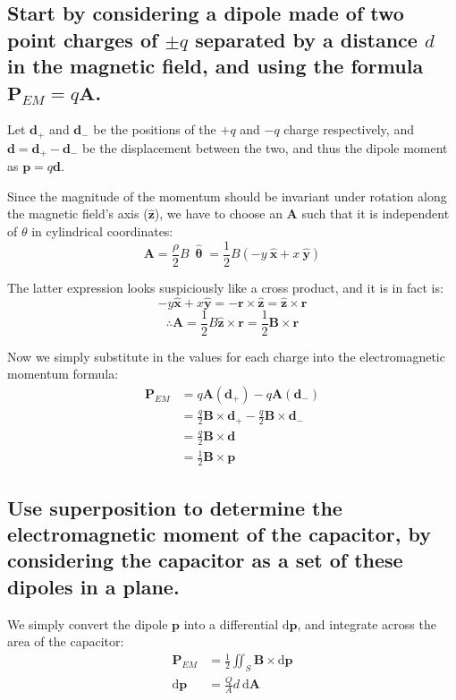\documentclass[a4paper]{scrartcl}
\begin{document}
\subsection{Start by considering a dipole made of two point charges of \(\pm q\) separated by a distance \(d\) in the magnetic field, and using the formula \(\mathbf{P}_{EM} = q \mathbf{A}\).}
Let \(\mathbf{d}_+\) and \(\mathbf{d}_-\) be the positions of the \(+q\) and \(-q\) charge respectively, and \(\mathbf{d} = \mathbf{d}_+ - \mathbf{d}_-\) be the displacement between the two, and thus the dipole moment as \(\mathbf{p} = q \mathbf{d}\).

Since the magnitude of the momentum should be invariant under rotation along the magnetic field's axis (\(\hat{\mathbf{z}}\)), we have to choose an \(\mathbf{A}\) such that it is independent of \(\theta\) in cylindrical coordinates:
\[\mathbf{A} = \frac{\rho}{2} B \:\hat{\boldsymbol{\uptheta}} = \frac{1}{2} B (-y \:\hat{\mathbf{x}} + x \:\hat{\mathbf{y}})\]

The latter expression looks suspiciously like a cross product, and it is in fact is:
\[-y \hat{\mathbf{x}} + x \hat{\mathbf{y}} = -\mathbf{r} \times \hat{\mathbf{z}} = \hat{\mathbf{z}} \times \mathbf{r}\]
\[\therefore \mathbf{A} = \frac{1}{2} B \hat{\mathbf{z}} \times \mathbf{r} = \frac{1}{2} \mathbf{B} \times \mathbf{r}\]

Now we simply substitute in the values for each charge into the electromagnetic momentum formula:
\begin{align*}
    \mathbf{P}_{EM} &= q \mathbf{A}(\mathbf{d}_+) - q \mathbf{A}(\mathbf{d}_-) \\
    &= \frac{q}{2} \mathbf{B} \times \mathbf{d}_+ - \frac{q}{2} \mathbf{B} \times \mathbf{d}_- \\
    &= \frac{q}{2} \mathbf{B} \times \mathbf{d} \\
    &= \frac{1}{2} \mathbf{B} \times \mathbf{p}
\end{align*}

\subsection{Use superposition to determine the electromagnetic moment of the capacitor, by considering the capacitor as a set of these dipoles in a plane.}
We simply convert the dipole \(\mathbf{p}\) into a differential \(\mathrm{d}\mathbf{p}\), and integrate across the area of the capacitor:
\begin{align*}
    \mathbf{P}_{EM} &= \frac{1}{2} \iint_S \mathbf{B} \times \mathrm{d}\mathbf{p} \\
    \mathrm{d}\mathbf{p} &= \frac{Q}{A} d \:\mathrm{d}\mathbf{A}
\end{align*}
\end{document}
